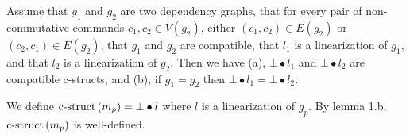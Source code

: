 \begin{mylemma}\label{lemma1}
Assume that $g_1$ and $g_2$ are two dependency graphs, 
that for every pair of non-commutative commands $c_1,c_2 \in V\left(g_2\right)$, either $\left( c_1,c_2 \right)\in E\left( g_2 \right)$ or $\left( c_2,c_1 \right)\in E\left( g_2 \right)$,
that $g_1$ and $g_2$ are compatible,
that $l_1$ is a linearization of $g_1$, and that $l_2$ is a linearization of $g_2$. 
Then we have (a), $\bot\bullet l_1$ and $\bot\bullet l_2$ are compatible c-structs, and (b), if $g_1 = g_2$ then $\bot\bullet l_1 = \bot\bullet l_2$.
\end{mylemma}

\begin{mydef}\label{lindef}
We define $\operatorname{c-struct}\left( m_p \right) = \bot\bullet l$ where $l$ is a linearization of $g_p$.
By lemma 1.b, $\operatorname{c-struct}\left( m_p \right)$ is well-defined.
\end{mydef}


\begin{comment}

\textbf{Graph of strongly connected components.} Given a graph $g$, let $\hat{g}$ be the graph whose vertices are the strongly connected components of $g$ (represented as sets of vertices) and where there is an edge from $g_1$ to $g_2$ if and only if there are two vertices $v_1$ and $v_2$ of $g$ such that $v_1 \in V\left( g_1 \right)$, $v_2 \in V\left( g_2 \right)$, and $\left( v_1,v_2 \right)\in E\left( g \right)$. Note that the reflexive and transitive closure of $V\left(  \hat{g} \right)$ is necessarily a partial order. 
For example, consider $h$ such that $V\left( h \right)=\aset{c_1,c_2,c_3,c_4}$ and $E\left( h \right)=\aset{\left( c_1,c_2 \right),\left( c_2,c_1 \right),\left( c_1,c_3 \right)}$. Then $V(\hat{h}) = \aset{\aset{c_1,c_2},\aset{c_3},\aset{c_4}}$ and $E( \hat{h} )=\aset{\left( \aset{c_1,c_2},\aset{c_3} \right)}$. We will use $h$ as an example in the rest of the section.

\textbf{Linearization function.} Consider a function $f$ mapping sets of commands to sequences of commands such that $f\left[ \mathcal{C} \right]$ is a total order on the set $\mathcal{C}$.

\textbf{Linearizations of a dependency graph.}
When $\hat{o}$ is a total order over the strongly connected components of $g$ such that $\hat{o} \in \opn{TOs}\left( \hat{g} \right)$, we say that a total order $l$ on $V\left( g \right)$ is a \emph{linearization} of $g$ when $\left(v_1,v_2\right) \in l$ iff (1) there exists $vs_1,vs_2\in V\left(\hat{g}\right)$ such that $v_1\in vs_1$, $v_2\in vs_2$, and $\left( vs_1,vs_2 \right)\in \hat{o}$, or (2) there exists $vs_1\in V\left(\hat{g}\right)$ such that
$v_1,v_2\in  vs_1$ and $\left( v_1,v_2 \right)\in f\left[  vs_1 \right]$.
For example, if $f\left[ \aset{c_1,c_2} \right] = \aseq{c_2,c_1}$ then $\aseq{c_2,c_1,c_3,c_4}$ is a linearization of $h$ but $\aseq{c_1,c_2,c_3,c_4}$ is not and neither is $\aseq{c_3,c_2,c_1,c_4}$

\end{comment}

